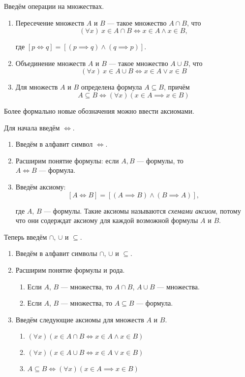 Введём операции на множествах.
\begin{enumerate}
	\item{}Пересечение множеств $A$ и $B$ --- такое множество $A\cap B$, что
	\[
		(\forall x)~x\in A\cap B\iff x\in A\land x\in B,
	\]

	где $[p\iff q]=[(p\implies q)\land (q\implies p)]$.

	\item{}Объединение множеств $A$ и $B$ --- такое множество $A\cup B$, что
	\[
		(\forall x)~x\in A\cup B\iff x\in A\lor x\in B
	\]

	\item{}Для множеств $A$ и $B$ определена формула $A\subseteq B$, причём
	\[
		A\subseteq B\iff (\forall x)(x\in A\implies x\in B)
	\]
\end{enumerate}

Более формально новые обозначения можно ввести аксиомами.

\pagebreak

Для начала введём $\iff$.

\begin{enumerate}
	\item{}Введём в алфавит символ $\iff$.
	\item{}Расширим понятие формулы: если $A,B$ --- формулы, то\\${A\iff B}$ --- формула.
		\item{}Введём аксиому:
		\[
			[A\iff B]=[(A\implies B)\land (B\implies A)],
		\]

		где $A$, $B$ --- формулы.
		Такие аксиомы называются {\it схемами аксиом},
		потому что они содерждат аксиому для каждой возможной формулы $A$ и $B$.
\end{enumerate}

Теперь введём $\cap$, $\cup$ и $\subseteq$.

\begin{enumerate}
	\item{}Введём в алфавит символы $\cap$, $\cup$ и $\subseteq$.
	\item{}Расширим понятие формулы и рода.
	\begin{enumerate}
		\item{}Если $A$, $B$ --- множества, то $A\cap B$, $A\cup B$ --- множества.
		\item{}Если $A$, $B$ --- множества, то $A\subseteq B$ --- формула.
	\end{enumerate}
	\item{}Введём следующие аксиомы для множеств $A$ и $B$.
	\begin{enumerate}
		\item{}$(\forall x)(x\in A\cap B\iff x\in A\land x\in B)$
		\item{}$(\forall x)(x\in A\cup B\iff x\in A\lor x\in B)$
		\item{}$A\subseteq B \iff (\forall x)(x\in A\implies x\in B)$
	\end{enumerate}
\end{enumerate}

